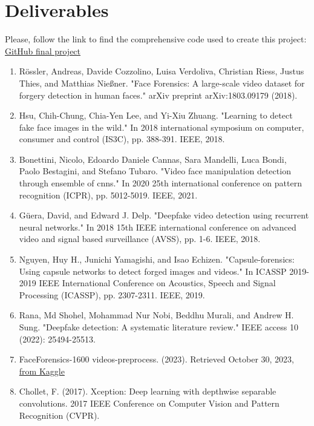 \documentclass{article}
\begin{document}
\section{Deliverables}
Please, follow the link to find the comprehensive code used to create this project:
\href{https://github.com/atomash13/CS577_Project}{GitHub final project}
\newpage


\begin{enumerate}
    \item Rössler, Andreas, Davide Cozzolino, Luisa Verdoliva, Christian Riess, Justus Thies, and Matthias Nießner. "Face Forensics: A large-scale video dataset for forgery detection in human faces." arXiv preprint arXiv:1803.09179 (2018).
    \item Hsu, Chih-Chung, Chia-Yen Lee, and Yi-Xiu Zhuang. "Learning to detect fake face images in the wild." In 2018 international symposium on computer, consumer and control (IS3C), pp. 388-391. IEEE, 2018.
    \item Bonettini, Nicolo, Edoardo Daniele Cannas, Sara Mandelli, Luca Bondi, Paolo Bestagini, and Stefano Tubaro. "Video face manipulation detection through ensemble of cnns." In 2020 25th international conference on pattern recognition (ICPR), pp. 5012-5019. IEEE, 2021.
    \item Güera, David, and Edward J. Delp. "Deepfake video detection using recurrent neural networks." In 2018 15th IEEE international conference on advanced video and signal based surveillance (AVSS), pp. 1-6. IEEE, 2018.
    \item Nguyen, Huy H., Junichi Yamagishi, and Isao Echizen. "Capsule-forensics: Using capsule networks to detect forged images and videos." In ICASSP 2019-2019 IEEE International Conference on Acoustics, Speech and Signal Processing (ICASSP), pp. 2307-2311. IEEE, 2019.
    \item Rana, Md Shohel, Mohammad Nur Nobi, Beddhu Murali, and Andrew H. Sung. "Deepfake detection: A systematic literature review." IEEE access 10 (2022): 25494-25513.
    \item FaceForensics-1600 videos-preprocess. (2023). Retrieved October 30, 2023, \href{https://www.kaggle.com/datasets/farhansharukhhasan/faceforensics1600-videospreprocess/data?select=data.}{from Kaggle}
    \item Chollet, F. (2017). Xception: Deep learning with depthwise separable convolutions. 2017 IEEE Conference on Computer Vision and Pattern Recognition (CVPR).
\end{enumerate}
\end{document}
